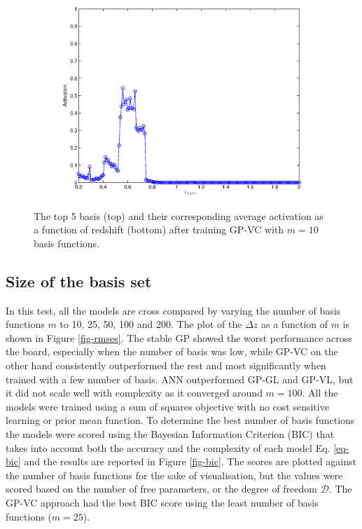 \documentclass[useAMS,usenatbib,fleqn]{mn2e}
\begin{document}
\begin{figure}
\begin{subfigure}[b]{0.175\textwidth}
                \includegraphics[width=\textwidth]{figures/activation_05.eps}
        \end{subfigure}
        
       \caption{The top 5 basis (top) and their corresponding average activation as a function of redshift (bottom) after training GP-VC with $m=10$ basis functions.}
	\label{fig-kernel-activations}
\end{figure}

\subsection{Size of the basis set}
In this test, all the models are cross compared by varying the number of basis functions $m$ to 10, 25, 50, 100 and 200. The plot of the $\Delta z$ as a function of $m$ is shown in Figure \ref{fig-rmses}. The stable GP showed the worst performance across the board, especially when the number of basis was low, while GP-VC on the other hand consistently outperformed the rest and most significantly when trained with a few number of basis. ANN outperformed GP-GL and GP-VL, but it did not scale well with complexity as it converged around $m=100$. All the models were trained using a sum of squares objective with no cost sensitive learning or prior mean function. To determine the best number of basis functions the models were scored using the Bayesian Information Criterion (BIC) \citep{schwarz1978}  that takes into account both the accuracy and the complexity of each model Eq. \eqref{eq-bic} and the results are reported in Figure \ref{fig-bic}. The scores are plotted against the number of basis functions for the sake of visualisation, but the values were scored based on the number of free parameters, or the degree of freedom $\mathcal{D}$. The GP-VC approach had the best BIC score using the least number of basis functions ($m=25$).
\end{document}
